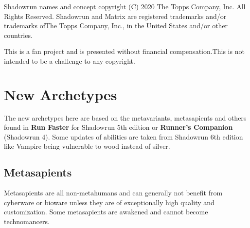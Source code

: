 \documentclass{book}
\begin{document}
\small Shadowrun names and concept copyright (C) 2020 The Topps Company, Inc. All Rights Reserved. Shadowrun and Matrix are registered trademarks and/or trademarks ofThe Topps Company, Inc., in the United States and/or other countries.

\small This is a fan project and is presented without financial compensation.This is not intended to be a challenge to any
copyright.
\newpage
\begin{multicols}{2}
\tableofcontents
\end{multicols}

\chapter{New Archetypes}
The new archetypes here are based on the metavariants, metasapients and others found in \textbf{Run Faster} for Shadowrun 5th edition or \textbf{Runner's Companion} (Shadowrun 4). Some updates of abilities are taken from Shadowrun 6th edition like Vampire being vulnerable to wood instead of silver.

\section{Metasapients}
\label{sec:metasapients}
Metasapients are all non-metahumans and can generally not benefit from cyberware or bioware unless they are of exceptionally high quality and customization. Some metasapients are awakened and cannot become technomancers.
\end{document}
